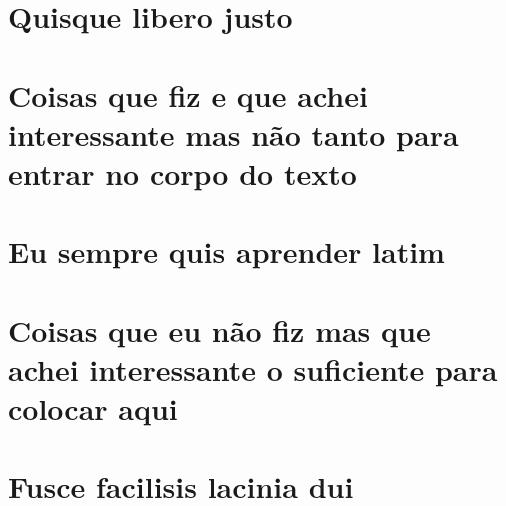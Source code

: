\documentclass[12pt, %
openright, 
oneside, %
a4paper,    %
brazil]{facom-ufu-abntex2}
\begin{document}
\postextual






\begin{apendicesenv}

\partapendices

\chapter{Quisque libero justo}

\lipsum[50]

\chapter{Coisas que fiz e que achei interessante mas não tanto para entrar no corpo do texto}
\lipsum[55-57]

\end{apendicesenv}



\begin{anexosenv}

\partanexos

\chapter{Eu sempre quis aprender latim}
\lipsum[30]

\chapter{Coisas que eu não fiz mas que achei interessante o suficiente para colocar aqui}

\lipsum[31]

\chapter{Fusce facilisis lacinia dui}

\lipsum[32]

\end{anexosenv}


\printindex
\end{document}
